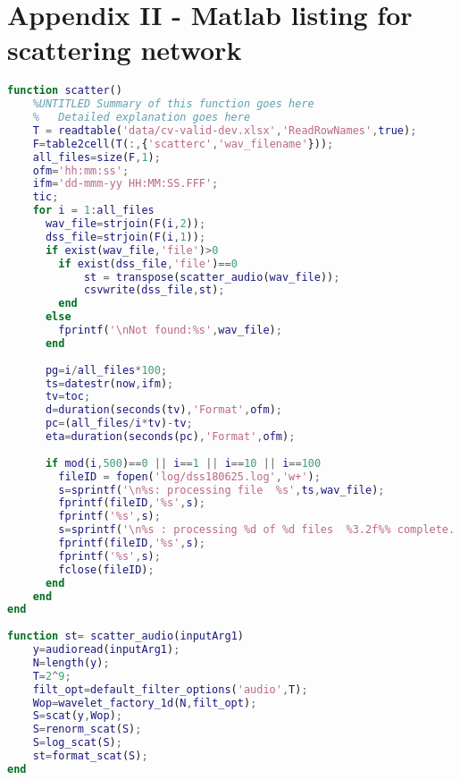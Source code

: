 
\section*{Appendix II - Matlab listing for scattering network}
\begin{lstlisting}[language=Matlab]
function scatter()
    %UNTITLED Summary of this function goes here
    %   Detailed explanation goes here
    T = readtable('data/cv-valid-dev.xlsx','ReadRowNames',true);
    F=table2cell(T(:,{'scatterc','wav_filename'}));
    all_files=size(F,1);
    ofm='hh:mm:ss';
    ifm='dd-mmm-yy HH:MM:SS.FFF';
    tic;
    for i = 1:all_files
      wav_file=strjoin(F(i,2));
      dss_file=strjoin(F(i,1));
      if exist(wav_file,'file')>0
      	if exist(dss_file,'file')==0
        	st = transpose(scatter_audio(wav_file));
        	csvwrite(dss_file,st);
      	end
      else
      	fprintf('\nNot found:%s',wav_file);
      end
 
      pg=i/all_files*100;
      ts=datestr(now,ifm);
      tv=toc;
      d=duration(seconds(tv),'Format',ofm);
      pc=(all_files/i*tv)-tv;
      eta=duration(seconds(pc),'Format',ofm);
 
      if mod(i,500)==0 || i==1 || i==10 || i==100
      	fileID = fopen('log/dss180625.log','w+');
      	s=sprintf('\n%s: processing file  %s',ts,wav_file);
      	fprintf(fileID,'%s',s);
      	fprintf('%s',s);
      	s=sprintf('\n%s : processing %d of %d files  %3.2f%% complete.. time elapsed = %s, eta = %s',ts,i,all_files,pg,d,eta);
      	fprintf(fileID,'%s',s);
      	fprintf('%s',s);
      	fclose(fileID);
      end
    end
end
 
function st= scatter_audio(inputArg1)
    y=audioread(inputArg1);
    N=length(y);
    T=2^9;
    filt_opt=default_filter_options('audio',T);
    Wop=wavelet_factory_1d(N,filt_opt);
    S=scat(y,Wop);
    S=renorm_scat(S);
    S=log_scat(S);
    st=format_scat(S);
end

\end{lstlisting}